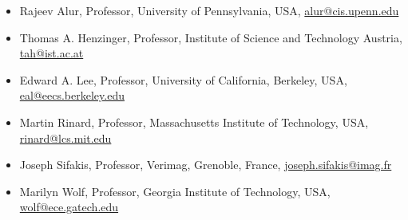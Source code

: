 \begin{itemize}
\item Rajeev Alur, Professor, University of Pennsylvania, USA, \href{mailto:alur@cis.upenn.edu}{alur@cis.upenn.edu}

\item Thomas A. Henzinger, Professor, Institute of Science and Technology Austria, \href{mailto:tah@ist.ac.at}{tah@ist.ac.at}

\item Edward A. Lee, Professor, University of California, Berkeley, USA, \href{mailto:eal@eecs.berkeley.edu}{eal@eecs.berkeley.edu}

\item Martin Rinard, Professor, Massachusetts Institute of Technology, USA, \href{mailto:rinard@lcs.mit.edu}{rinard@lcs.mit.edu}

\item Joseph Sifakis, Professor, Verimag, Grenoble, France, \href{mailto:joseph.sifakis@imag.fr}{joseph.sifakis@imag.fr}

\item Marilyn Wolf, Professor, Georgia Institute of Technology, USA, \href{mailto:wolf@ece.gatech.edu}{wolf@ece.gatech.edu}
\end{itemize}

